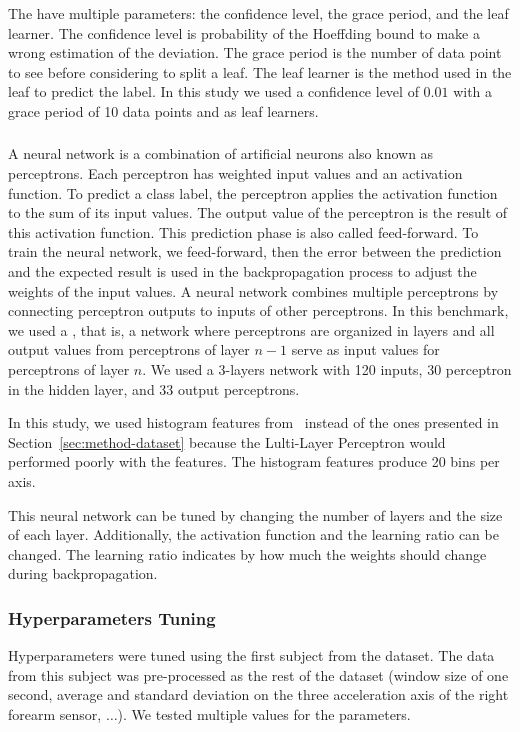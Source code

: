 The \hoeffdingtree have multiple parameters: the
confidence level, the grace period, and the leaf
learner. The confidence level is probability of
the Hoeffding bound to make a wrong estimation of
the deviation. The grace period is the number of
data point to see before considering to split a
leaf. The leaf learner is the method used in the
leaf to predict the label.  In this study we used
a confidence level of $0.01$ with a grace period
of 10 data points and \naivebayes as leaf
learners.

\subsubsection{\FNN}
A neural network is a combination of artificial
neurons also known as perceptrons. Each
perceptron has weighted input values and an
activation function. To predict a class label, the
perceptron applies the activation function to the sum
of its input values. The output
value of the perceptron is the result of this
activation function. This prediction phase is also
called feed-forward. To train the neural network,
we feed-forward, then the error between the
prediction and the expected result is used in the
backpropagation process to adjust the weights of
the input values.  A neural network combines
multiple perceptrons by connecting perceptron outputs
to inputs of other perceptrons.  In
this benchmark, we used a \FNN, 
that is, a network where perceptrons are organized in
layers and all output
values from perceptrons of layer $n-1$ serve as
input values for perceptrons of layer $n$. 
We used a 3-layers network with 120 inputs, 30
perceptron in the hidden layer, and 33 output
perceptrons.

In this study, we used histogram features
from~\cite{omid_2019} instead of the ones
presented in Section~\ref{sec:method-dataset}
because the Lulti-Layer Perceptron would performed
poorly with the features. The histogram features
produce 20 bins per axis.

This neural network can be tuned by changing the
number of layers and the size of each layer.
Additionally, the activation function and the
learning ratio can be changed. The learning ratio
indicates by how much the weights should change
during backpropagation.


\subsubsection{Hyperparameters Tuning}
Hyperparameters were tuned using the first
subject from the \banosdataset dataset.  The data from
this subject was pre-processed as the rest of
the \banosdataset dataset (window size of one second,
average and standard deviation on the three
acceleration axis of the right forearm sensor,
$\ldots$). We tested multiple values for the
parameters.

